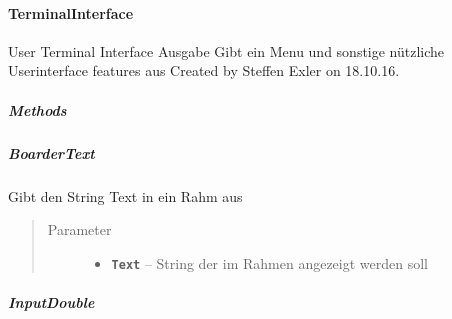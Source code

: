 \documentclass[letterpaper,10pt,ngerman]{sphinxmanual}
\begin{document}
\paragraph{TerminalInterface}
\label{com/linuxluigi/polynomial/TerminalInterface:terminalinterface}\label{com/linuxluigi/polynomial/TerminalInterface::doc}

\begin{fulllineitems}
\label{com/linuxluigi/polynomial/TerminalInterface:com.linuxluigi.polynomial.TerminalInterface}
User Terminal Interface Ausgabe Gibt ein Menu und sonstige nützliche Userinterface features aus Created by Steffen Exler on 18.10.16.

\end{fulllineitems}



\subparagraph{Methods}
\label{com/linuxluigi/polynomial/TerminalInterface:methods}

\subparagraph{BoarderText}
\label{com/linuxluigi/polynomial/TerminalInterface:boardertext}

\begin{fulllineitems}
\label{com/linuxluigi/polynomial/TerminalInterface:com.linuxluigi.polynomial.TerminalInterface.BoarderText(String)}
Gibt den String Text in ein Rahm aus
\begin{quote}\begin{description}
\item[{Parameter}] \leavevmode\begin{itemize}
\item {} 
\textbf{\texttt{Text}} -- String der im Rahmen angezeigt werden soll

\end{itemize}

\end{description}\end{quote}

\end{fulllineitems}



\subparagraph{InputDouble}
\label{com/linuxluigi/polynomial/TerminalInterface:inputdouble}
\end{document}
